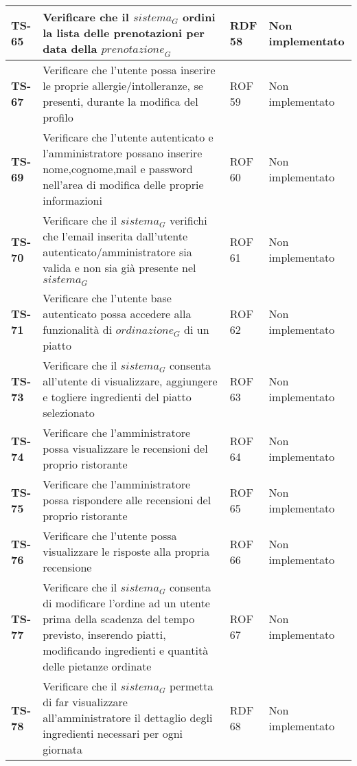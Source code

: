 \begin{longtable}{|>{\centering\arraybackslash}p{1.5cm}|p{9.8cm}|p{2cm}|p{3.5cm}|}
    \hline
    \rowcolor{gray!10}
    \textbf{TS-65} & Verificare che il $\textit{sistema}_G$ ordini la lista delle prenotazioni per data della $\textit{prenotazione}_G$ & RDF 58 & Non implementato \\ 
    \hline
    \rowcolor{gray!10}
    \textbf{TS-67} & Verificare che l'utente possa inserire le proprie allergie/intolleranze, se presenti, durante la modifica del profilo & ROF 59 & Non implementato \\ 
    \hline
    \rowcolor{gray!10}
    \textbf{TS-69} & Verificare che l'utente autenticato e l'amministratore possano inserire nome,cognome,mail e password nell'area di modifica delle proprie informazioni & ROF 60 & Non implementato \\ 
    \hline
    \rowcolor{gray!10}
    \textbf{TS-70} & Verificare che il $\textit{sistema}_G$ verifichi che l'email inserita dall'utente autenticato/amministratore sia valida e non sia già presente nel $\textit{sistema}_G$ & ROF 61 & Non implementato \\ 
    \hline
    \rowcolor{gray!10}
    \textbf{TS-71} & Verificare che l'utente base autenticato possa accedere alla funzionalità di $\textit{ordinazione}_G$ di un piatto & ROF 62 & Non implementato \\
    \hline
    \rowcolor{gray!10}
    \textbf{TS-73} & Verificare che il $\textit{sistema}_G$ consenta all'utente di visualizzare, aggiungere e togliere ingredienti del piatto selezionato & ROF 63 & Non implementato \\
    \hline
    \rowcolor{gray!10}
    \textbf{TS-74} & Verificare che l'amministratore possa visualizzare le recensioni del proprio ristorante & ROF 64 & Non implementato \\ 
    \hline
    \rowcolor{gray!10}
    \textbf{TS-75} & Verificare che l'amministratore possa rispondere alle recensioni del proprio ristorante & ROF 65 & Non implementato \\ 
    \hline
    \rowcolor{gray!10}
    \textbf{TS-76} & Verificare che l'utente possa visualizzare le risposte alla propria recensione & ROF 66 & Non implementato \\
    \hline
    \rowcolor{gray!10}
    \textbf{TS-77} & Verificare che il $\textit{sistema}_G$ consenta di modificare l'ordine ad un utente prima della scadenza del tempo previsto, inserendo piatti, modificando ingredienti e quantità delle pietanze ordinate & ROF 67 & Non implementato \\ 
    \hline
    \rowcolor{gray!10}
    \textbf{TS-78} & Verificare che il $\textit{sistema}_G$ permetta di far visualizzare all'amministratore il dettaglio degli ingredienti necessari per ogni giornata & RDF 68 & Non implementato \\ 

\end{longtable}
